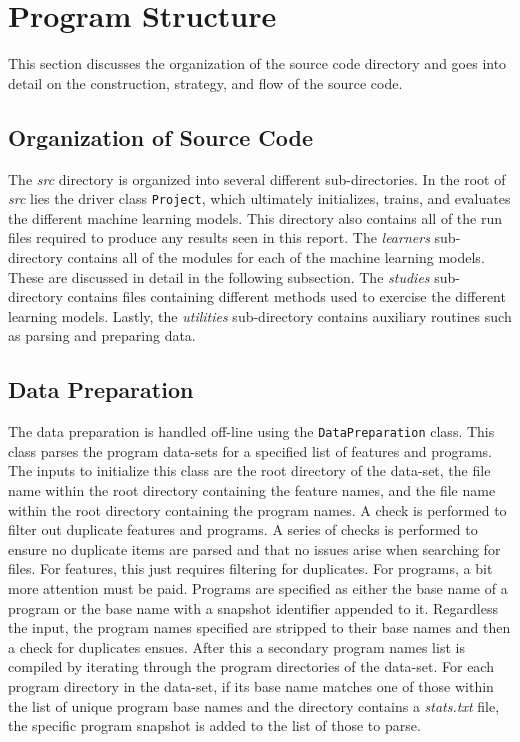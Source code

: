 \documentclass[paper=a4, fontsize=11pt]{scrartcl} %
\begin{document}
\section{Program Structure} \label{sec: structure}

This section discusses the organization of the source code directory and goes into detail on the construction, strategy, and flow of the source code.

\subsection*{Organization of Source Code}

The {\em src} directory is organized into several different sub-directories.
In the root of {\em src} lies the driver class \verb|Project|, which ultimately initializes, trains, and evaluates the different machine learning models.
This directory also contains all of the run files required to produce any results seen in this report.
The {\em learners} sub-directory contains all of the modules for each of the machine learning models.
These are discussed in detail in the following subsection.
The {\em studies} sub-directory contains files containing different methods used to exercise the different learning models.
Lastly, the {\em utilities} sub-directory contains auxiliary routines such as parsing and preparing data.

\subsection*{Data Preparation}

The data preparation is handled off-line using the \verb|DataPreparation| class.
This class parses the program data-sets for a specified list of features and programs.
The inputs to initialize this class are the root directory of the data-set, the file name within the root directory containing the feature names, and the file name within the root directory containing the program names.
A check is performed to filter out duplicate features and programs.
A series of checks is performed to ensure no duplicate items are parsed and that no issues arise when searching for files.
For features, this just requires filtering for duplicates.
For programs, a bit more attention must be paid.
Programs are specified as either the base name of a program or the base name with a snapshot identifier appended to it.
Regardless the input, the program names specified are stripped to their base names and then a check for duplicates ensues.
After this a secondary program names list is compiled by iterating through the program directories of the data-set.
For each program directory in the data-set, if its base name matches one of those within the list of unique program base names and the directory contains a {\em stats.txt} file, the specific program snapshot is added to the list of those to parse.
\\
\end{document}

